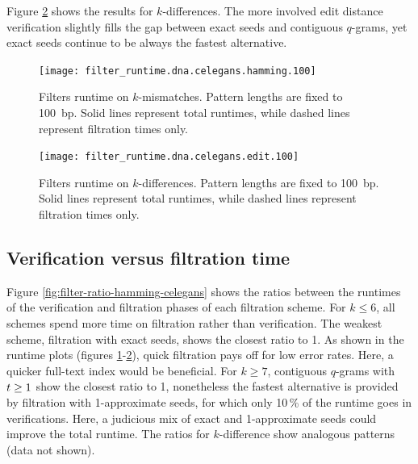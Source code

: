 Figure \ref{fig:filter-runtime-edit-celegans} shows the results for $k$-differences.
The more involved edit distance verification slightly fills the gap between exact seeds and contiguous $q$-grams, yet exact seeds continue to be always the fastest alternative.

\begin{figure}[b]
\begin{center}
\caption[Filters runtime on $k$-mismatches]{Filters runtime on $k$-mismatches. Pattern lengths are fixed to 100~bp. Solid lines represent total runtimes, while dashed lines represent filtration times only.}
\label{fig:filter-runtime-hamming-celegans}
\texttt{[image: filter\_runtime.dna.celegans.hamming.100]}
\end{center}
\end{figure}

\begin{figure}[t]
\begin{center}
\caption[Filters runtime on $k$-differences]{Filters runtime on $k$-differences. Pattern lengths are fixed to 100~bp. Solid lines represent total runtimes, while dashed lines represent filtration times only.}
\label{fig:filter-runtime-edit-celegans}
\texttt{[image: filter\_runtime.dna.celegans.edit.100]}
\end{center}
\end{figure}

\subsection{Verification versus filtration time}

Figure \ref{fig:filter-ratio-hamming-celegans} shows the ratios between the runtimes of the verification and filtration phases of each filtration scheme.
For $k \leq 6$, all schemes spend more time on filtration rather than verification.
The weakest scheme, filtration with exact seeds, shows the closest ratio to 1.
As shown in the runtime plots (figures \ref{fig:filter-runtime-hamming-celegans}-\ref{fig:filter-runtime-edit-celegans}), quick filtration pays off for low error rates.
Here, a quicker full-text index would be beneficial.
For $k \geq 7$, contiguous $q$-grams with $t \geq 1$ show the closest ratio to 1, nonetheless the fastest alternative is provided by filtration with 1-approximate seeds, for which only 10\,\% of the runtime goes in verifications.
Here, a judicious mix of exact and 1-approximate seeds could improve the total runtime.
The ratios for $k$-difference show analogous patterns (data not shown).

